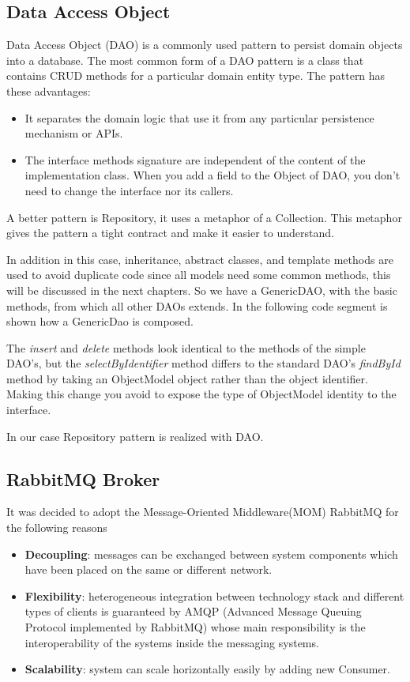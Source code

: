 \documentclass[a4paper,12pt]{report}
\begin{document}
\subsection{Data Access Object}
Data Access Object (DAO) is a commonly used pattern to persist domain objects into a database. The most common form of a DAO pattern is a class that contains CRUD methods for a particular domain entity type.
The pattern has these advantages:
\begin{itemize}
\item It separates the domain logic that use it from any particular persistence mechanism or APIs.
\item The interface methods signature are independent of the content of the implementation class. When you add a field to the Object of DAO, you don’t need to change the interface nor its callers.
\end{itemize}

A better pattern is Repository, it uses a metaphor of a Collection. This metaphor gives the pattern a tight contract and make it easier to understand.

In addition in this case, inheritance, abstract classes, and template methods are used to avoid duplicate code since all models need some common methods, this will be discussed in the next chapters.
So we have a GenericDAO, with the basic methods, from which all other DAOs extends.
In the following code segment is shown how a GenericDao is composed.



The \textit{insert} and \textit{delete} methods look identical to the methods of the simple DAO's, but the \textit{selectByIdentifier} method differs to the standard DAO’s \textit{findById} method by taking an ObjectModel object rather than the object identifier. 
Making this change you avoid to expose the type of ObjectModel identity to the interface.

In our case Repository pattern is realized with DAO.

\subsection{RabbitMQ Broker}
It was decided to adopt the Message-Oriented Middleware(MOM) RabbitMQ for the following reasons
\begin{itemize}
\item \textbf{Decoupling}: messages can be exchanged between system components which have been placed on the same or different network.
\item \textbf{Flexibility}: heterogeneous integration between technology stack and different types of clients is guaranteed by AMQP (Advanced Message Queuing Protocol implemented by RabbitMQ) whose main responsibility is the interoperability of the systems inside the messaging systems.
\item \textbf{Scalability}: system can scale horizontally easily by adding new Consumer.
\end{itemize}
\end{document}
